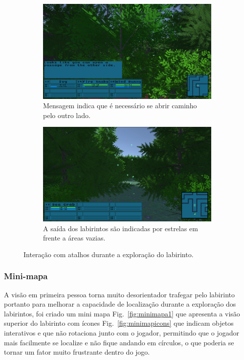 \begin{figure}[h!]
\begin{subfigure}[b]{0.47\linewidth}
    \includegraphics[width=\linewidth]{warning.jpg}
    \caption{Mensagem indica que é necessário se abrir caminho pelo outro lado.}
  \end{subfigure}
  \begin{subfigure}[b]{0.47\linewidth}
    \includegraphics[width=\linewidth]{exit.jpg}
    \caption{A saída dos labirintos são indicadas por estrelas em frente a áreas vazias.}
  \end{subfigure}
  \caption{Interação com atalhos durante a exploração do labirinto.}
  \label{fig:shortcut}
\end{figure}
\pagebreak
\subsubsection{Mini-mapa}

A visão em primeira pessoa torna muito desorientador trafegar pelo labirinto portanto para melhorar a capacidade de localização durante a exploração dos labirintos, foi criado um mini mapa Fig.~\ref{fig:minimapa1} que apresenta a visão superior do labirinto com ícones Fig.~\ref{fig:minimapicons} que indicam objetos interativos e que não rotaciona junto com o jogador, permitindo que o jogador mais facilmente se localize e não fique andando em círculos, o que poderia se tornar um fator muito frustrante dentro do jogo.

